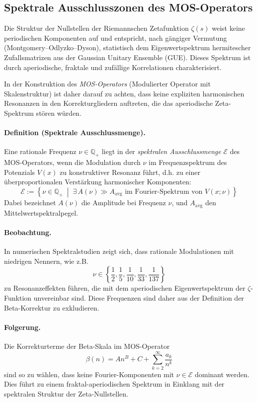 \subsection*{Spektrale Ausschlusszonen des MOS-Operators}

Die Struktur der Nullstellen der Riemannschen Zetafunktion $\zeta(s)$ weist keine periodischen Komponenten auf und entspricht, nach gängiger Vermutung (Montgomery–Odlyzko–Dyson), statistisch dem Eigenwertspektrum hermitescher Zufallsmatrizen aus der Gaussian Unitary Ensemble (GUE). Dieses Spektrum ist durch aperiodische, fraktale und zufällige Korrelationen charakterisiert.

In der Konstruktion des \emph{MOS-Operators} (Modulierter Operator mit Skalenstruktur) ist daher darauf zu achten, dass keine expliziten harmonischen Resonanzen in den Korrekturgliedern auftreten, die das aperiodische Zeta-Spektrum stören würden.

\paragraph{Definition (Spektrale Ausschlussmenge).}
Eine rationale Frequenz $\nu \in \mathbb{Q}_+$ liegt in der \emph{spektralen Ausschlussmenge} $\mathcal{E}$ des MOS-Operators, wenn die Modulation durch $\nu$ im Frequenzspektrum des Potenzials $V(x)$ zu konstruktiver Resonanz führt, d.h. zu einer überproportionalen Verstärkung harmonischer Komponenten:
\[
\mathcal{E} := \left\{ \nu \in \mathbb{Q}_+ \;\middle|\; \exists \, A(\nu) \gg A_\text{avg} \text{ im Fourier-Spektrum von } V(x;\nu) \right\}
\]
Dabei bezeichnet $A(\nu)$ die Amplitude bei Frequenz $\nu$, und $A_\text{avg}$ den Mittelwertspektralpegel.

\paragraph{Beobachtung.}
In numerischen Spektralstudien zeigt sich, dass rationale Modulationen mit niedrigen Nennern, wie z.B.
\[
\nu \in \left\{ \frac{1}{2}, \frac{1}{5}, \frac{1}{10}, \frac{1}{33}, \frac{1}{137} \right\}
\]
zu Resonanzeffekten führen, die mit dem aperiodischen Eigenwertspektrum der $\zeta$-Funktion unvereinbar sind. Diese Frequenzen sind daher aus der Definition der Beta-Korrektur zu exkludieren.

\paragraph{Folgerung.}
Die Korrekturterme der Beta-Skala im MOS-Operator
\[
\beta(n) = A n^B + C + \sum_{k=2}^{\infty} \frac{a_k}{n^k}
\]
sind so zu wählen, dass keine Fourier-Komponenten mit $\nu \in \mathcal{E}$ dominant werden. Dies führt zu einem fraktal-aperiodischen Spektrum in Einklang mit der spektralen Struktur der Zeta-Nullstellen.